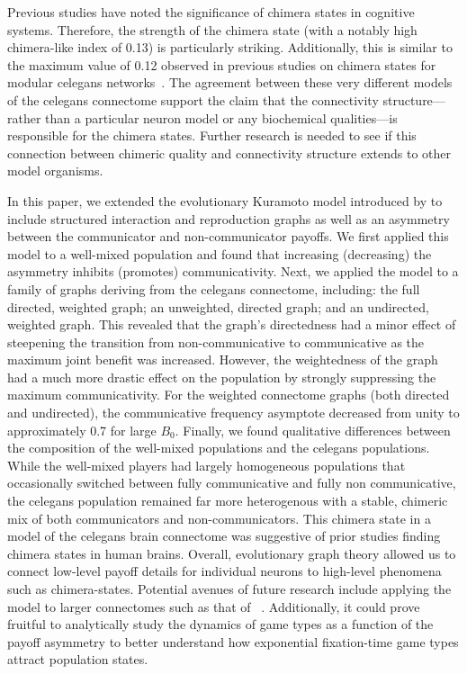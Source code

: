 \documentclass[pdflatex,lineno,referee,sn-nature]{sn-jnl}
\begin{document}
Previous studies \citep[\eg][]{bansal2019cognitive,santos2017chimera}
have noted the significance of chimera states in cognitive systems.
Therefore, the strength of the chimera state
(with a notably high chimera-like index of \num{0.13}) is particularly striking.
Additionally, this is similar to the maximum value of \num{0.12}
observed in previous studies on chimera states
for modular \gls{celegans} networks~\citep{hizanidis2016chimera}.
The agreement between these very different models
of the \gls{celegans} connectome
support the claim that the connectivity structure---rather than
a particular neuron model or any biochemical qualities---is responsible
for the chimera states.
Further research is needed to see if this connection between chimeric quality
and connectivity structure extends to other model organisms.

In this paper, we extended the evolutionary Kuramoto model
introduced by \tripp{}
to include structured interaction and reproduction graphs
as well as an asymmetry between
the communicator and non-communicator payoffs.
We first applied this model to a well-mixed population
and found that increasing (decreasing) the asymmetry
inhibits (promotes) communicativity.
Next, we applied the model to
a family of graphs deriving from the \gls{celegans} connectome,
including: the full directed, weighted graph;
an unweighted, directed graph;
and an undirected, weighted graph.
This revealed that the graph's directedness
had a minor effect of steepening the transition
from non-communicative to communicative
as the maximum joint benefit was increased.
However, the weightedness of the graph had a much more drastic effect
on the population by strongly suppressing the maximum communicativity.
For the weighted connectome graphs (both directed and undirected),
the communicative frequency asymptote decreased from unity
to approximately \num{0.7} for large $B_0$.
Finally, we found qualitative differences between the composition
of the well-mixed populations and the \gls{celegans} populations.
While the well-mixed players had largely homogeneous populations
that occasionally switched between fully communicative
and fully non communicative,
the \gls{celegans} population remained far more heterogenous
with a stable, chimeric mix of both communicators and non-communicators.
This chimera state in a model of the \gls{celegans} brain connectome
was suggestive of prior studies finding chimera states in human brains.
Overall, evolutionary graph theory allowed us
to connect low-level payoff details for individual neurons
to high-level phenomena such as chimera-states.
Potential avenues of future research include applying the model
to larger connectomes such as that
of ~\citep{schlegel2024whole}.
Additionally, it could prove fruitful to analytically study
the dynamics of game types as a function of the payoff asymmetry
to better understand how exponential fixation-time
game types attract population states.
\end{document}
